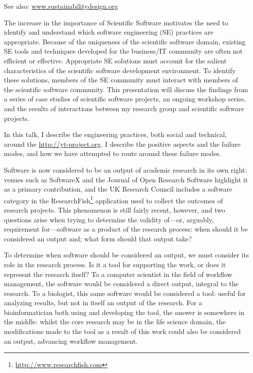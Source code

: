 \documentclass[a4paper,UKenglish]{dagrep}
\begin{document}
See also: \url{www.sustainabilitydesign.org}


The increase in the importance of Scientific Software motivates the need to identify and understand which software engineering (SE) practices are appropriate. Because of the uniqueness of the scientific software domain, existing SE tools and techniques developed for the business/IT community are often not efficient or effective. Appropriate SE solutions must account for the salient characteristics of the scientific software development environment. To identify these solutions, members of the SE community must interact with members of the scientific software community. This presentation will discuss the findings from a series of case studies of scientific software projects, an ongoing workshop series, and the results of interactions between my research group and scientific software projects.


In this talk, I describe the engineering practices, both social and
technical, around the \href{yt project}{http://yt-project.org}.  I describe the
positive aspects and the failure modes, and how we have attempted to
route around these failure modes.


Software is now considered to be an output of academic research in its own right: venues such as SoftwareX and the Journal of Open Research Software highlight it as a primary contribution, and the UK Research Council includes a software category in the ResearchFish\footnote{\url{http://www.researchfish.com}} application used to collect the outcomes of research projects. This phenomenon is still fairly recent, however, and two questions arise when trying to determine the validity of---or, arguably, requirement for---software as a product of the research process: when should it be considered an output and; what form should that output take?

To determine when software should be considered an output, we must consider its role in the research process. Is it a tool for supporting the work, or does it represent the research itself? To a computer scientist in the field of workflow management, the software would be considered a direct output, integral to the research. To a biologist, this same software would be considered a tool: useful for analyzing results, but not in itself an output of the research. For a bioinformatician both using and developing the tool, the answer is somewhere in the middle: whilst the core research may be in the life science domain, the modifications made to the tool as a result of this work could also be considered an output, advancing workflow management.
\end{document}

